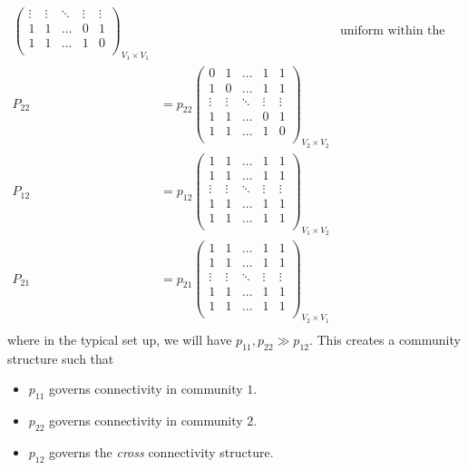 \begin{itemize}
\[\begin{alignedat}{3}
\begin{pmatrix}
				      \vdots & \vdots & \ddots & \vdots & \vdots \\
				      1      & 1      & \ldots & 0      & 1      \\
				      1      & 1      & \ldots & 1      & 0      \\
			      \end{pmatrix}_{V_1 \times V_1}&& \text{uniform within the block}\\
			      P_{22} &= p_{22}\begin{pmatrix}
				      0      & 1      & \ldots & 1      & 1      \\
				      1      & 0      & \ldots & 1      & 1      \\
				      \vdots & \vdots & \ddots & \vdots & \vdots \\
				      1      & 1      & \ldots & 0      & 1      \\
				      1      & 1      & \ldots & 1      & 0      \\
			      \end{pmatrix}_{V_2 \times V_2}\\
			      P_{12} &= p_{12}\begin{pmatrix}
				      1      & 1      & \ldots & 1      & 1      \\
				      1      & 1      & \ldots & 1      & 1      \\
				      \vdots & \vdots & \ddots & \vdots & \vdots \\
				      1      & 1      & \ldots & 1      & 1      \\
				      1      & 1      & \ldots & 1      & 1      \\
			      \end{pmatrix}_{V_1 \times V_2}\\
			      P_{21} &= p_{21}\begin{pmatrix}
				      1      & 1      & \ldots & 1      & 1      \\
				      1      & 1      & \ldots & 1      & 1      \\
				      \vdots & \vdots & \ddots & \vdots & \vdots \\
				      1      & 1      & \ldots & 1      & 1      \\
				      1      & 1      & \ldots & 1      & 1      \\
			      \end{pmatrix}_{V_2 \times V_1}\\
		      \end{alignedat}
	      \]
	      where in the typical set up, we will have \(p_{11}, p_{22} \gg p_{12}\). This creates a community structure such that
	      \begin{itemize}
		      \item \(p_{11}\) governs connectivity in community \(1\).
		      \item \(p_{22}\) governs connectivity in community \(2\).
		      \item \(p_{12}\) governs the \emph{cross} connectivity structure.
	      \end{itemize}


\end{itemize}

